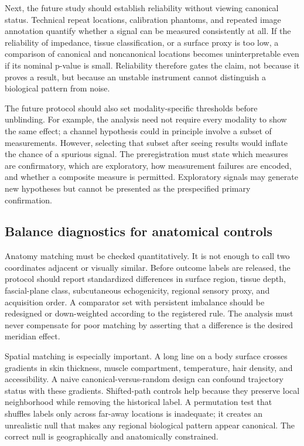 \documentclass[conference]{IEEEtran}
\begin{document}
Next, the future study should establish reliability without viewing canonical status. Technical repeat locations, calibration phantoms, and repeated image annotation quantify whether a signal can be measured consistently at all. If the reliability of impedance, tissue classification, or a surface proxy is too low, a comparison of canonical and noncanonical locations becomes uninterpretable even if its nominal p-value is small. Reliability therefore gates the claim, not because it proves a result, but because an unstable instrument cannot distinguish a biological pattern from noise.

The future protocol should also set modality-specific thresholds before unblinding. For example, the analysis need not require every modality to show the same effect; a channel hypothesis could in principle involve a subset of measurements. However, selecting that subset after seeing results would inflate the chance of a spurious signal. The preregistration must state which measures are confirmatory, which are exploratory, how measurement failures are encoded, and whether a composite measure is permitted. Exploratory signals may generate new hypotheses but cannot be presented as the prespecified primary confirmation.

\subsection{Balance diagnostics for anatomical controls}

Anatomy matching must be checked quantitatively. It is not enough to call two coordinates adjacent or visually similar. Before outcome labels are released, the protocol should report standardized differences in surface region, tissue depth, fascial-plane class, subcutaneous echogenicity, regional sensory proxy, and acquisition order. A comparator set with persistent imbalance should be redesigned or down-weighted according to the registered rule. The analysis must never compensate for poor matching by asserting that a difference is the desired meridian effect.

Spatial matching is especially important. A long line on a body surface crosses gradients in skin thickness, muscle compartment, temperature, hair density, and accessibility. A naive canonical-versus-random design can confound trajectory status with these gradients. Shifted-path controls help because they preserve local neighborhood while removing the historical label. A permutation test that shuffles labels only across far-away locations is inadequate; it creates an unrealistic null that makes any regional biological pattern appear canonical. The correct null is geographically and anatomically constrained.
\end{document}
